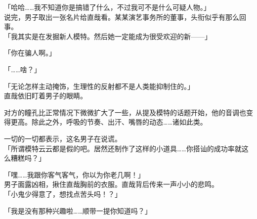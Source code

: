 「哈哈……我不知道你是搞错了什么，不过我可不是什么可疑人物。」\\

说完，男子取出一张名片给直哉看。某某演艺事务所的董事，头衔似乎有那么回事。\\ %

「我其实是在发掘新人模特。然后她一定能成为很受欢迎的新——」

「你在骗人啊。」

「……啥？」

「无论怎样主动掩饰，生理性的反射都不是人类能抑制住的。」\\

直哉依旧盯着男子的眼睛。

对方的瞳孔比正常情况下微微扩大了一些，从提及模特的话题开始，他的音调也变得更高。除此之外，呼吸的节奏、出汗、嘴唇的动态……诸如此类。%

一切的一切都表示，这名男子在说谎。\\ %

「所谓模特云云都是假的吧。居然还制作了这样的小道具……你搭讪的成功率就这么糟糕吗？」

「嘿……我跟你客气客气，你以为你老几啊！」\\  %

男子面露凶相，揪住直哉胸前的衣服。直哉背后传来一声小小的悲鸣。\\

「小鬼少得意了，想找点苦头吗！？」

「我是没有那种兴趣啦……顺带一提你知道吗？」

